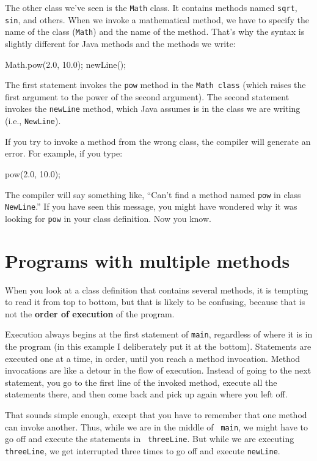 The other class we've seen is the {\tt Math} class.  It contains
methods named {\tt sqrt}, {\tt sin}, and others.  When
we invoke a mathematical method, we have to specify
the name of the class ({\tt Math}) and the name of the method.
That's why the syntax is slightly different for Java
methods and the methods we write:

\begin{code}
    Math.pow(2.0, 10.0);
    newLine();
\end{code}
%
The first statement invokes the {\tt pow} method in
the {\tt Math class} (which raises the first argument to the
power of the second argument).  The second statement invokes
the {\tt newLine} method, which Java assumes is in the class
we are writing (i.e., {\tt NewLine}).

If you try to invoke a method from the wrong class, the
compiler will generate an error.  For example, if you
type:

\begin{code}
    pow(2.0, 10.0);
\end{code}
%
The compiler will say something like, ``Can't find a method
named {\tt pow} in class {\tt NewLine}.''  If you have
seen this message, you might have wondered why it was looking
for {\tt pow} in your class definition.  Now you know.


\section{Programs with multiple methods}

When you look at a class definition that contains several methods, it
is tempting to read it from top to bottom, but that is likely to be
confusing, because that is not the {\bf order of execution} of the
program.

Execution always begins at the first statement of {\tt main},
regardless of where it is in the program (in this example I deliberately
put it at the bottom).  Statements are executed one at a time, in
order, until you reach a method invocation.  Method invocations are
like a detour in the flow of execution.  Instead of going to the next
statement, you go to the first line of the invoked method, execute all
the statements there, and then come back and pick up again where you
left off.

That sounds simple enough, except that you have to remember that one
method can invoke another.  Thus, while we are in the middle of {\tt
main}, we might have to go off and execute the statements in {\tt
threeLine}.  But while we are executing {\tt threeLine}, we get
interrupted three times to go off and execute {\tt newLine}.

